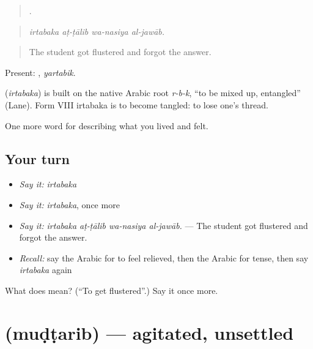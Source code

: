 \begin{quote}
   .
\end{quote}

\begin{quote}
\emph{irtabaka aṭ-ṭālib wa-nasiya al-jawāb.}
\end{quote}

\begin{quote}
The student got flustered and forgot the answer.
\end{quote}

Present: , \emph{yartabik}.

\begin{cousinweb}
\textbf{} (\emph{irtabaka}) is built on the native Arabic root \emph{r-b-k}, \textquotedblleft{}to be mixed up, entangled\textquotedblright{} (Lane). Form VIII irtabaka is to become tangled: to lose one's thread.
\end{cousinweb}

\begin{grammarlens}[title={What you've built}]
One more word for describing what you lived and felt.
\end{grammarlens}

\subsection*{Your turn}
\begin{itemize}
\raggedright
  \item \emph{Say it:} \emph{irtabaka}
  \item \emph{Say it:} \emph{irtabaka}, once more
  \item \emph{Say it:} \emph{irtabaka aṭ-ṭālib wa-nasiya al-jawāb.} — The student got flustered and forgot the answer.
  \item \emph{Recall:} say the Arabic for to feel relieved, then the Arabic for tense, then say \emph{irtabaka} again
\end{itemize}

\begin{tcolorbox}[breakable,colback=teal!4,colframe=teal!35!black,title={Before you move on}]
What does  mean? (\textquotedblleft{}To get flustered\textquotedblright{}.) Say it once more.
\end{tcolorbox}
\section[\texorpdfstring{\ar{مضطرب} (muḍṭarib)}{مضطرب (muḍṭarib)}]{ (muḍṭarib) — agitated, unsettled}

